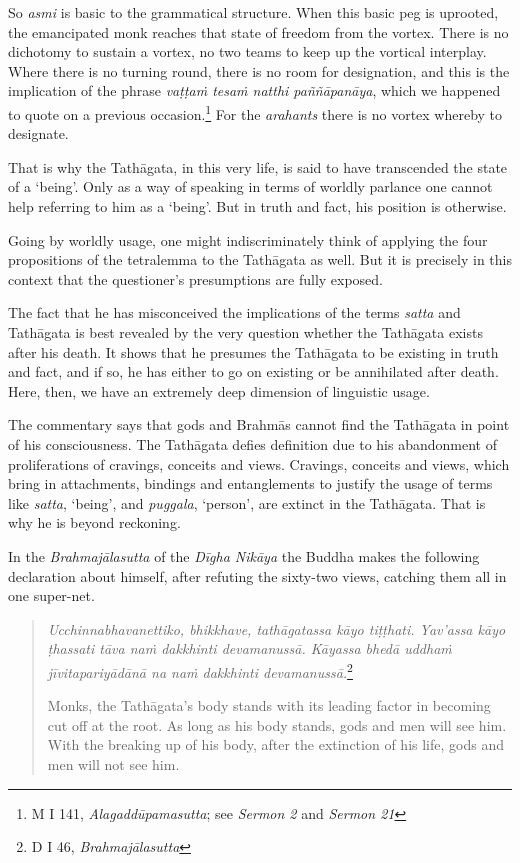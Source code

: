 So \emph{asmi} is basic to the grammatical structure. When this basic peg is uprooted, the emancipated monk reaches that state of freedom from the vortex. There is no dichotomy to sustain a vortex, no two teams to keep up the vortical interplay. Where there is no turning round, there is no room for designation, and this is the implication of the phrase \emph{vaṭṭaṁ tesaṁ natthi paññāpanāya}, which we happened to quote on a previous occasion.\footnote{M I 141, \emph{Alagaddūpamasutta}; see \emph{Sermon 2} and \emph{Sermon 21}} For the \emph{arahants} there is no vortex whereby to designate.

That is why the Tathāgata, in this very life, is said to have transcended the state of a `being'. Only as a way of speaking in terms of worldly parlance one cannot help referring to him as a `being'. But in truth and fact, his position is otherwise.

Going by worldly usage, one might indiscriminately think of applying the four propositions of the tetralemma to the Tathāgata as well. But it is precisely in this context that the questioner's presumptions are fully exposed.

The fact that he has misconceived the implications of the terms \emph{satta} and Tathāgata is best revealed by the very question whether the Tathāgata exists after his death. It shows that he presumes the Tathāgata to be existing in truth and fact, and if so, he has either to go on existing or be annihilated after death. Here, then, we have an extremely deep dimension of linguistic usage.

The commentary says that gods and Brahmās cannot find the Tathāgata in point of his consciousness. The Tathāgata defies definition due to his abandonment of proliferations of cravings, conceits and views. Cravings, conceits and views, which bring in attachments, bindings and \mbox{entanglements} to justify the usage of terms like \emph{satta}, `being', and \emph{puggala}, `person', are extinct in the Tathāgata. That is why he is beyond reckoning.

In the \emph{Brahmajālasutta} of the \emph{Dīgha Nikāya} the Buddha makes the following declaration about himself, after refuting the sixty-two views, catching them all in one super-net.

\begin{quote}
\emph{Ucchinnabhavanettiko, bhikkhave, tathāgatassa kāyo tiṭṭhati. Yav'assa kāyo ṭhassati tāva naṁ dakkhinti devamanussā. Kāyassa bhedā uddhaṁ jīvitapariyādānā na naṁ dakkhinti devamanussā.}\footnote{D I 46, \emph{Brahmajālasutta}}

Monks, the Tathāgata's body stands with its leading factor in becoming cut off at the root. As long as his body stands, gods and men will see him. With the breaking up of his body, after the extinction of his life, gods and men will not see him.
\end{quote}

